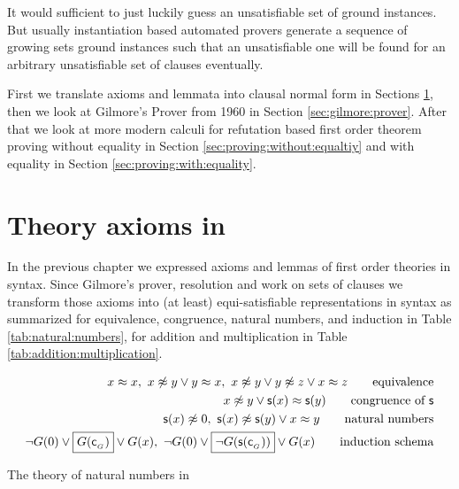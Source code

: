 It would sufficient to just luckily guess an unsatisfiable set of ground instances. 
But usually instantiation based automated provers generate a sequence of growing sets ground instances 
such that an unsatisfiable one will be found 
for an arbitrary unsatisfiable set of clauses
eventually.

First we translate axioms and lemmata into clausal normal form in Sections \ref{sec:clausal:normal:form},
then we look at Gilmore's Prover from 1960 in Section \ref{sec:gilmore:prover}. 
After that we look at more modern calculi for refutation based first order theorem proving 
without equality in Section \ref{sec:proving:without:equaltiy} and with equality in Section \ref{sec:proving:with:equality}.


%
%
%

%
%

\section{Theory axioms in \CNF}\label{sec:clausal:normal:form}

In the previous chapter we expressed axioms and lemmas of first order theories in \FOF syntax. 
Since Gilmore's prover, resolution and \InstGen work on sets of clauses we transform
those axioms into (at least) equi-satisfiable representations in \CNF syntax 
as summarized for equivalence, congruence, natural numbers, and induction in Table \ref{tab:natural:numbers}, 
for addition and multiplication in Table \ref{tab:addition:multiplication}.

\begin{table}[hbt]	
	\begin{align*}
	x\mEQ x,\ 
	x\mNE y\lor y\mEQ x,\ 
	x\mNE y\lor y\mNE z\lor x\mEQ z
	\tag*{equivalence}
	\\
	x\mNE y\lor \msucc(x)\mEQ\msucc(y) 
	\tag*{congruence of $\msucc$}
	\\
	\msucc(x) \mNE 0,\ 
	\msucc(x) \mNE \msucc(y) \lor x \mEQ y
	\tag*{natural numbers}
	\\
	\lnot G(0) \lor \boxed{G(\mc_{_G})} \lor G(x),\ 
	\lnot G(0) \lor \boxed{\lnot G(\msucc(\mc_{_G}))} \lor G(x)
	\tag*{induction schema}
	\end{align*}
	\caption{The theory of natural numbers in \CNF}
	\label{tab:natural:numbers}
\end{table}

